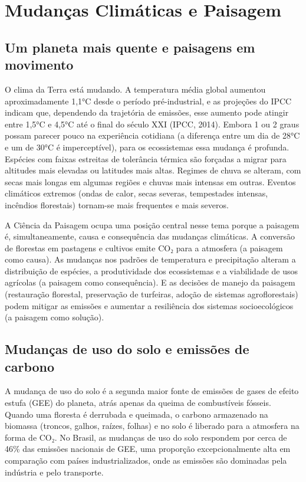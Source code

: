 \documentclass[
  portuguese,
  11pt,
  a4paper,
  open=any]{scrbook}
\begin{document}
\chapter{Mudanças Climáticas e Paisagem}\label{sec-mudancas-climaticas}

\section{Um planeta mais quente e paisagens em
movimento}\label{um-planeta-mais-quente-e-paisagens-em-movimento}

O clima da Terra está mudando. A temperatura média global aumentou
aproximadamente 1,1°C desde o período pré-industrial, e as projeções do
IPCC indicam que, dependendo da trajetória de emissões, esse aumento
pode atingir entre 1,5°C e 4,5°C até o final do século XXI (IPCC, 2014).
Embora 1 ou 2 graus possam parecer pouco na experiência cotidiana (a
diferença entre um dia de 28°C e um de 30°C é imperceptível), para os
ecossistemas essa mudança é profunda. Espécies com faixas estreitas de
tolerância térmica são forçadas a migrar para altitudes mais elevadas ou
latitudes mais altas. Regimes de chuva se alteram, com secas mais longas
em algumas regiões e chuvas mais intensas em outras. Eventos climáticos
extremos (ondas de calor, secas severas, tempestades intensas, incêndios
florestais) tornam-se mais frequentes e mais severos.

A Ciência da Paisagem ocupa uma posição central nesse tema porque a
paisagem é, simultaneamente, causa e consequência das mudanças
climáticas. A conversão de florestas em pastagens e cultivos emite CO₂
para a atmosfera (a paisagem como causa). As mudanças nos padrões de
temperatura e precipitação alteram a distribuição de espécies, a
produtividade dos ecossistemas e a viabilidade de usos agrícolas (a
paisagem como consequência). E as decisões de manejo da paisagem
(restauração florestal, preservação de turfeiras, adoção de sistemas
agroflorestais) podem mitigar as emissões e aumentar a resiliência dos
sistemas socioecológicos (a paisagem como solução).

\section{Mudanças de uso do solo e emissões de
carbono}\label{mudanuxe7as-de-uso-do-solo-e-emissuxf5es-de-carbono}

A mudança de uso do solo é a segunda maior fonte de emissões de gases de
efeito estufa (GEE) do planeta, atrás apenas da queima de combustíveis
fósseis. Quando uma floresta é derrubada e queimada, o carbono
armazenado na biomassa (troncos, galhos, raízes, folhas) e no solo é
liberado para a atmosfera na forma de CO₂. No Brasil, as mudanças de uso
do solo respondem por cerca de 46\% das emissões nacionais de GEE, uma
proporção excepcionalmente alta em comparação com países
industrializados, onde as emissões são dominadas pela indústria e pelo
transporte.
\end{document}
